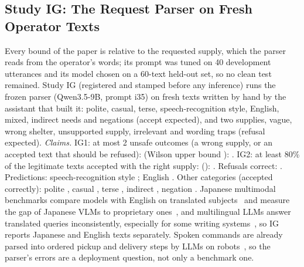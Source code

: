 \subsection{Study IG: The Request Parser on Fresh Operator Texts}\label{sec:moved-ig}
Every bound of the paper is relative to the requested supply, which the parser reads from the operator's words; its prompt was tuned on 40 development utterances and its model chosen on a 60-text held-out set, so no clean test remained. Study IG (registered and stamped before any inference) runs the frozen parser (Qwen3.5-9B, prompt i35) on \IGTexts{} fresh texts written by hand by the assistant that built it: polite, casual, terse, speech-recognition style, English, mixed, indirect needs and negations (accept expected), and two supplies, vague, wrong shelter, unsupported supply, irrelevant and wording traps (refusal expected).
\emph{Claims.} IG1: at most 2 unsafe outcomes (a wrong supply, or an accepted text that should be refused): \IGUnsafe{} (Wilson upper bound \IGUnsafeUpper): \IGOneHolds. IG2: at least 80\% of the legitimate texts accepted with the right supply: \IGAccepted{} (\IGAcceptedRate): \IGTwoHolds. Refusals correct: \IGRefused. Predictions: speech-recognition style \IGAsr{} \IGPredOneHolds; English \IGEnglish{} \IGPredTwoHolds. Other categories (accepted correctly): polite \IGPolite, casual \IGCasual, terse \IGTerse, indirect \IGIndirect, negation \IGNegation.
Japanese multimodal benchmarks compare models with English on translated subjects~\cite{onohara2024jmmmu} and measure the gap of Japanese VLMs to proprietary ones~\cite{inoue2024heronbench}, and multilingual LLMs answer translated queries inconsistently, especially for some writing systems~\cite{gupta2025foundintranslation}, so IG reports Japanese and English texts separately. Spoken commands are already parsed into ordered pickup and delivery steps by LLMs on robots~\cite{srivastava2024speechnav}, so the parser's errors are a deployment question, not only a benchmark one.
